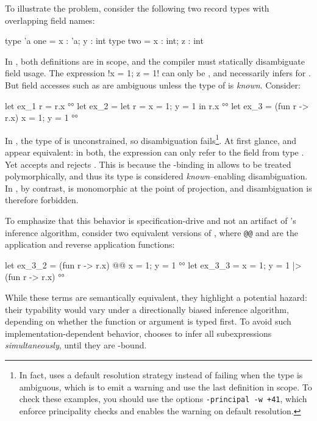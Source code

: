\documentclass[acmsmall,screen,nonacm,review]{acmart}
\begin{document}
To illustrate the problem, consider the following two record types
with overlapping field names:
\begin{program}[input]
type 'a one = {x : 'a; y : int}
type two = {x : int; z : int}
\end{program}
In \OCaml, both definitions are in scope, and the compiler must
statically disambiguate field usage. The expression \ocaml!{x = 1; z = 1}! can
only be , and  necessarily infers  for .
But field accesses such as  are ambiguous unless the type of  is
\emph{known}. Consider:
\begin{program}[input]
let ex_1 r = r.x                         	°°
let ex_2 = let r = {x = 1; y = 1} in r.x        °°
let ex_3 = (fun r -> r.x) {x = 1; y = 1}        °°
\end{program}
In , the type of  is unconstrained, so disambiguation
fails\footnote {In fact, \OCaml uses a default
resolution strategy instead of failing when the type is ambiguous,
  which is to emit a warning and use the last definition in scope. To
  check these examples, you should use the options
  \texttt{-principal -w +41}, which enforce principality checks and enables
  the warning on default resolution.}.
\relax
At first glance,  and  appear equivalent: in both,
the expression  can only refer to the field from type .
Yet \OCaml accepts  and rejects .
This is because the -binding in  allows  to be
treated polymorphically, and thus its type is considered \emph{known}--enabling
disambiguation. In , by contrast,  is monomorphic at the point of
projection, and disambiguation is therefore forbidden.

To emphasize that this behavior is specification-drive and not an
artifact of \OCaml's inference algorithm, consider two equivalent versions of
, where \texttt{@@} and \ocaml{|>} are the application and reverse application
functions:
\begin{program}[input]
let ex_3_2 = (fun r -> r.x) @@ {x = 1; y = 1}   °°
let ex_3_3 = {x = 1; y = 1} |> (fun r -> r.x)   °°
\end{program}
While these terms are semantically equivalent, they highlight a potential hazard:
their typability would vary under a directionally biased inference algorithm,
depending on whether the function or argument is typed first.
To avoid such implementation-dependent behavior, \OCaml chooses to infer
all subexpressions \emph{simultaneously}, until they are -bound.
\end{document}
